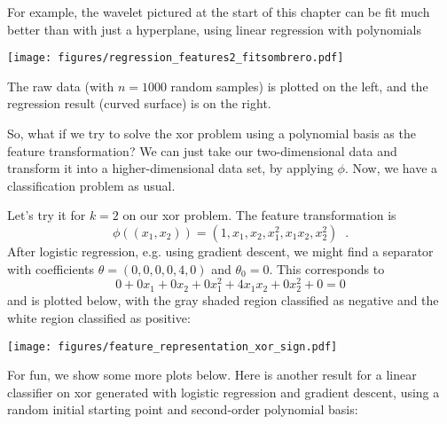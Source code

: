 For example, the wavelet pictured at the start of this chapter can be fit much better than with just a hyperplane, using linear regression
with polynomials

\centerline{\texttt{[image: figures/regression\_features2\_fitsombrero.pdf]}}

\noindent
The raw data (with $n=1000$ random samples) is plotted on the left, and the regression result (curved surface) is on the right.


So, what if we try to solve the {\sc xor} problem using a polynomial
basis as the feature transformation?  We can just take our
two-dimensional data and transform it into a higher-dimensional data
set, by applying $\phi$.  Now, we have a classification problem as
usual.

Let's try it for $k = 2$ on our {\sc xor} problem.  The feature
transformation is 
\[\phi((x_1, x_2)) = (1, x_1, x_2, x_1^2, x_1 x_2, x_2^2)\;\;.\]
After logistic regression, e.g. using gradient descent, we might find a separator
with coefficients $\theta = (0, 0, 0, 0, 4, 0)$ and $\theta_0 =
0$.  
This corresponds to 
\[0 + 0 x_1 + 0 x_2 + 0 x_1^2 + 4 x_1 x_2 + 0x_2^2 + 0 = 0\]
and is plotted below, with the gray shaded region classified as
negative and the white region classified as positive:
\begin{examplebox}
\begin{center}
\texttt{[image: figures/feature\_representation\_xor\_sign.pdf]}
\end{center}
\end{examplebox}

For fun, we show some more plots below.  Here is another result for a
linear classifier on {\sc xor} generated with logistic regression and
gradient descent, using a random initial starting point and second-order
polynomial basis:

